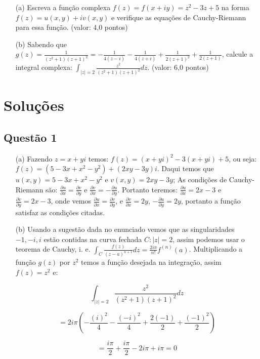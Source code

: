 \documentclass{report}
\begin{document}
\begin{enumerate}

\item[(a)] Escreva a fun\c c\~ao complexa $f(z) = f(x + iy) = z^2 -3z + 5$ na forma $f(z) = u(x, y) + i v(x, y)$ e verifique as equa\c c\~oes de Cauchy-Riemann para essa fun\c c\~ao. (valor: 4,0 pontos)

\item[(b)] Sabendo que $g(z)=\displaystyle \frac1{(z^2+1)(z+1)^2}=-\frac1{4(z-i)}-\frac1{4(z+i)}+\frac1{2(z+1)^2}+\frac1{2(z+1)}$, calcule a integral complexa: $\displaystyle \int_{|z|=2}\frac{z^2}{(z^2+1)(z+1)^2}dz$. (valor: 6,0 pontos)

\end{enumerate}

\section{\color{red} Solu\c c\~oes}

\subsection{\color{red} Quest\~ao 1}

\begin{enumerate}

\item[(a)] Fazendo $z=x+yi$ temos: $f(z)=(x+yi)^2-3(x+yi)+5$, ou seja: $f(z)=(5-3x+x^2-y^2)+(2xy-3y)i$. Daqui temos que $u(x,y)=5-3x+x^2-y^2$ e $v(x,y)=2xy-3y$; As condi\c c\~oes de Cauchy-Riemann s\~ao: $\displaystyle \frac{\partial u}{\partial x}=\frac{\partial v}{\partial y}$ e $\displaystyle \frac{\partial v}{\partial x}=-\frac{\partial u}{\partial y}$. Portanto teremos: $\displaystyle \frac{\partial u}{\partial x}=2x-3$ e $\displaystyle \frac{\partial v}{\partial y}=2x-3$, onde vemos $\displaystyle \frac{\partial u}{\partial x}=\frac{\partial v}{\partial y}$, e $\displaystyle \frac{\partial v}{\partial x}=2y$, $\displaystyle-\frac{\partial u}{\partial y}=2y$, portanto a fun\c c\~ao satisfaz as condi\c c\~oes citadas.

\item[(b)] Usando a sugest\~ao dada no enunciado vemos que as singularidades $-1, -i, i$ est\~ao contidas na curva fechada $C:|z|=2$, assim podemos usar o teorema de Cauchy, i. e. $\displaystyle \int_C \frac{f(z)}{(z-a)^{n+1}} dz=\frac{2i\pi}{ n!}f^{(n)}(a)$. Multiplicando a fun\c c\~ao $g(z)$ por $z^2$ temos a fun\c c\~ao desejada na integra\c c\~ao, assim $f(z)=z^2$ e: 

$$\int_{|z|=2}\frac{z^2}{(z^2+1)(z+1)^2}dz$$

$$=2i\pi\left(-\frac{(i)^2}{4}-\frac{(-i)^2}{4}+\frac{2(-1)}{2}+\frac{(-1)^2}{2}\right)$$

$$=\frac{i\pi}{2}+\frac{i\pi}{2}-2i\pi+i\pi=0$$

\end{enumerate}
\end{document}
